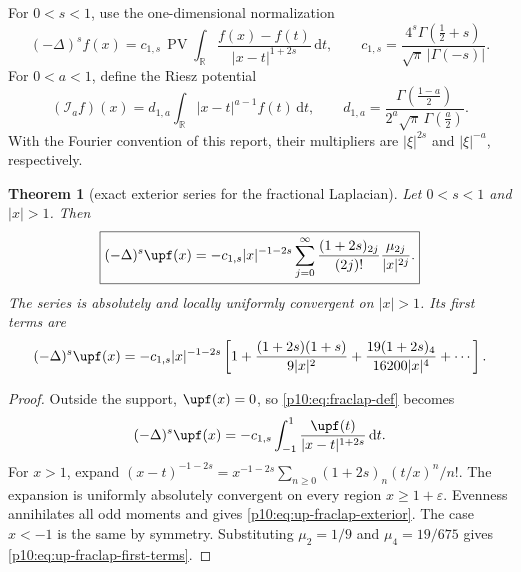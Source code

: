 \documentclass[11pt,oneside]{article}
\newtheorem{theorem}{Theorem}[section]
\theoremstyle{definition}
\theoremstyle{remark}
\newcommand{\R}{\mathbb R}
\newcommand{\dd}{\,\mathrm d}
\newcommand{\1}{\mathbf 1}
\begin{document}
For \(0<s<1\), use the one-dimensional normalization
\begin{equation}\label{p10:eq:fraclap-def}
 (-\Delta)^s f(x)
 =c_{1,s}\,\operatorname{PV}\!\int_{\R}
   \frac{f(x)-f(t)}{|x-t|^{1+2s}}\dd t,
 \qquad
 c_{1,s}=\frac{4^s\Gamma(\frac12+s)}{\sqrt\pi\,|\Gamma(-s)|}.
\end{equation}
For \(0<a<1\), define the Riesz potential
\begin{equation}\label{p10:eq:Riesz-def}
 (\mathcal I_a f)(x)
 =d_{1,a}\int_{\R}|x-t|^{a-1}f(t)\dd t,
 \qquad
 d_{1,a}=\frac{\Gamma(\frac{1-a}{2})}
 {2^a\sqrt\pi\,\Gamma(\frac a2)}.
\end{equation}
With the Fourier convention of this report, their multipliers are \(|\xi|^{2s}\)
and \(|\xi|^{-a}\), respectively.

\begin{theorem}[exact exterior series for the fractional Laplacian]
\label{p10:thm:up-fraclap-exterior}
Let \(0<s<1\) and \(|x|>1\).  Then
\begin{equation}\label{p10:eq:up-fraclap-exterior}
 \boxed{
 (-\Delta)^s\upf(x)
 =-c_{1,s}|x|^{-1-2s}
  \sum_{j=0}^{\infty}
   \frac{(1+2s)_{2j}}{(2j)!}
   \frac{\mu_{2j}}{|x|^{2j}}.}
\end{equation}
The series is absolutely and locally uniformly convergent on \(|x|>1\).  Its first
terms are
\begin{equation}\label{p10:eq:up-fraclap-first-terms}
 (-\Delta)^s\upf(x)
 =-c_{1,s}|x|^{-1-2s}
 \left[
  1+\frac{(1+2s)(1+s)}{9|x|^2}
  +\frac{19(1+2s)_4}{16200|x|^4}
  +\cdots
 \right].
\end{equation}
\end{theorem}

\begin{proof}
Outside the support, \(\upf(x)=0\), so \eqref{p10:eq:fraclap-def} becomes
\begin{equation}\label{p10:eq:fraclap-outside-integral}
 (-\Delta)^s\upf(x)
 =-c_{1,s}\int_{-1}^1\frac{\upf(t)}{|x-t|^{1+2s}}\dd t.
\end{equation}
For \(x>1\), expand
\(
 (x-t)^{-1-2s}
 =x^{-1-2s}\sum_{n\ge0}(1+2s)_n(t/x)^n/n!
\).
The expansion is uniformly absolutely convergent on every region \(x\ge1+\varepsilon\).
Evenness annihilates all odd moments and gives \eqref{p10:eq:up-fraclap-exterior}.  The
case \(x<-1\) is the same by symmetry.  Substituting
\(\mu_2=1/9\) and \(\mu_4=19/675\) gives
\eqref{p10:eq:up-fraclap-first-terms}.
\end{proof}
\end{document}

